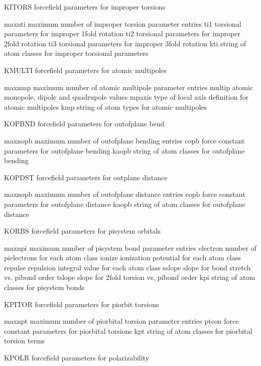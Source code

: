 \documentclass[letterpaper,11pt,english]{sphinxmanual}
\begin{document}
KITORS  forcefield parameters for improper torsions

maxnti  maximum number of improper torsion parameter entries
ti1     torsional parameters for improper 1\sphinxhyphen{}fold rotation
ti2     torsional parameters for improper 2\sphinxhyphen{}fold rotation
ti3     torsional parameters for improper 3\sphinxhyphen{}fold rotation
kti     string of atom classes for improper torsional parameters

KMULTI  forcefield parameters for atomic multipoles

maxnmp  maximum number of atomic multipole parameter entries
multip  atomic monopole, dipole and quadrupole values
mpaxis  type of local axis definition for atomic multipoles
kmp     string of atom types for atomic multipoles

KOPBND  forcefield parameters for out\sphinxhyphen{}of\sphinxhyphen{}plane bend

maxnopb maximum number of out\sphinxhyphen{}of\sphinxhyphen{}plane bending entries
copb    force constant parameters for out\sphinxhyphen{}of\sphinxhyphen{}plane bending
kaopb   string of atom classes for out\sphinxhyphen{}of\sphinxhyphen{}plane bending

KOPDST  forcefield parameters for out\sphinxhyphen{}plane distance

maxnopb maximum number of out\sphinxhyphen{}of\sphinxhyphen{}plane distance entries
copb    force constant parameters for out\sphinxhyphen{}of\sphinxhyphen{}plane distance
kaopb   string of atom classes for out\sphinxhyphen{}of\sphinxhyphen{}plane distance

KORBS   forcefield parameters for pisystem orbitals

maxnpi  maximum number of pisystem bond parameter entries
electron        number of pi\sphinxhyphen{}electrons for each atom class
ionize  ionization potential for each atom class
repulse repulsion integral value for each atom class
sslope  slope for bond stretch vs. pi\sphinxhyphen{}bond order
tslope  slope for 2\sphinxhyphen{}fold torsion vs. pi\sphinxhyphen{}bond order
kpi     string of atom classes for pisystem bonds

KPITOR  forcefield parameters for pi\sphinxhyphen{}orbit torsions

maxnpt  maximum number of pi\sphinxhyphen{}orbital torsion parameter entries
ptcon   force constant parameters for pi\sphinxhyphen{}orbital torsions
kpt     string of atom classes for pi\sphinxhyphen{}orbital torsion terms

KPOLR   forcefield parameters for polarizability
\end{document}
